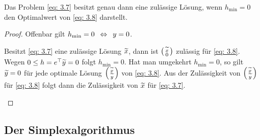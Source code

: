\begin{satz} %
	Das Problem \eqref{eq: 3.7} besitzt genau dann eine zulässige Lösung, wenn $h_{\min} = 0$ den Optimalwert von \eqref{eq: 3.8} darstellt.
\end{satz}
\begin{proof}
	Offenbar gilt $h_{\min} = 0 \enskip \Leftrightarrow \enskip y = 0$.
	\begin{proof-equivalence}
		\hinrichtung Besitzt \eqref{eq: 3.7} eine zulässige Lösung $\widetilde{x}$, dann ist $\left( \begin{smallmatrix} \widetilde{x} \\ 0 \end{smallmatrix} \right)$ zulässig für \eqref{eq: 3.8}. Wegen $0 \le h = e^{\top} \widetilde{y} = 0$ folgt $h_{\min} = 0$.
		\rueckrichtung Hat man umgekehrt $h_{\min} = 0$, so gilt $\widetilde{y} = 0$ für jede optimale Lösung $\left( \begin{smallmatrix} \widetilde{x} \\ \widetilde{y} \end{smallmatrix} \right)$ von \eqref{eq: 3.8}. Aus der Zulässigkeit von $\left( \begin{smallmatrix} \widetilde{x} \\ \widetilde{y} \end{smallmatrix} \right)$ für \eqref{eq: 3.8} folgt dann die Zulässigkeit von $\widetilde{x}$ für \eqref{eq: 3.7}.
	\end{proof-equivalence}
\end{proof}

\subsection{Der Simplexalgorithmus}

